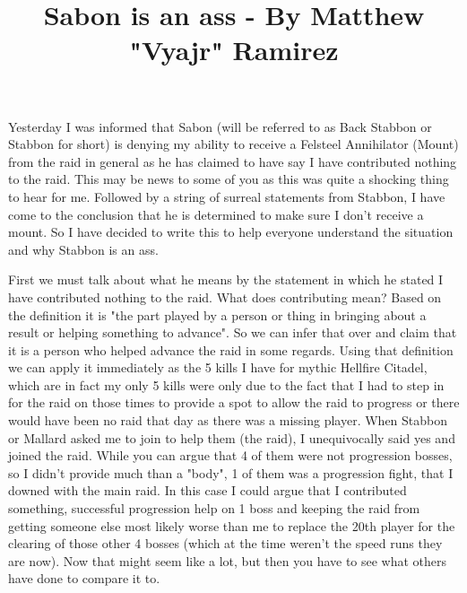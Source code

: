 \documentclass[9pt,letterpaper]{article}
\author{}
\date{}
\title{\vspace{-3.5cm} Sabon is an ass - By Matthew "Vyajr" Ramirez\vspace{-2.5cm}}
\begin{document}
\maketitle
\vspace{1.0cm}
Yesterday I was informed that Sabon (will be referred to as Back Stabbon or Stabbon for short) is denying my ability to receive a Felsteel Annihilator (Mount) from the raid in general as he has claimed to have say I have contributed nothing to the raid. This may be news to some of you as this was quite a shocking thing to hear for me. Followed by a string of surreal statements from Stabbon, I have come to the conclusion that he is determined to make sure I don't receive a mount. So I have decided to write this to help everyone understand the situation and why Stabbon is an ass.\vspace{0.5cm}

First we must talk about what he means by the statement in which he stated I have contributed nothing to the raid. What does contributing mean? Based on the definition it is "the part played by a person or thing in bringing about a result or helping something to advance". So we can infer that over and claim that it is a person who helped advance the raid in some regards. Using that definition we can apply it immediately as the 5 kills I have for mythic Hellfire Citadel, which are in fact my only 5 kills were only due to the fact that I had to step in for the raid on those times to provide a spot to allow the raid to progress or there would have been no raid that day as there was a missing player. When Stabbon or Mallard asked me to join to help them (the raid), I unequivocally said yes and joined the raid. While you can argue that 4 of them were not progression bosses, so I didn't provide much than a "body", 1 of them was a progression fight, that I downed with the main raid. In this case I could argue that I contributed something, successful progression help on 1 boss and keeping the raid from getting someone else most likely worse than me to replace the 20th player for the clearing of those other 4 bosses (which at the time weren't the speed runs they are now). Now that might seem like a lot, but then you have to see what others have done to compare it to.\vspace{0.5cm}
\end{document}
